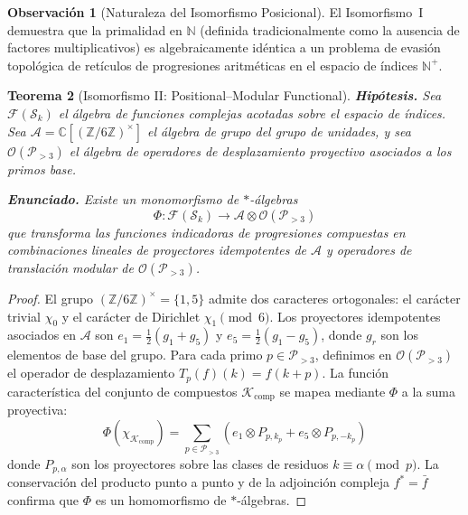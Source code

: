 \documentclass{article}
\numberwithin{equation}{section}
\theoremstyle{plain}
\newtheorem{theorem}{Teorema}[section]
\theoremstyle{definition}
\newtheorem{remark}[theorem]{Observación}
\begin{document}
\begin{remark}[Naturaleza del Isomorfismo Posicional]
El Isomorfismo~I demuestra que la primalidad en $\mathbb{N}$ (definida tradicionalmente como la ausencia de factores multiplicativos) es algebraicamente idéntica a un problema de evasión topológica de retículos de progresiones aritméticas en el espacio de índices $\mathbb{N}^+$.
\end{remark}

\begin{theorem}[Isomorfismo II: Positional--Modular Functional]
\label{thm:iso-II}
\textbf{Hipótesis.} Sea $\mathcal{F}(\mathcal{S}_k)$ el álgebra de funciones complejas acotadas sobre el espacio de índices. Sea $\mathcal{A} = \mathbb{C}[(\mathbb{Z}/6\mathbb{Z})^\times]$ el álgebra de grupo del grupo de unidades, y sea $\mathcal{O}(\mathcal{P}_{>3})$ el álgebra de operadores de desplazamiento proyectivo asociados a los primos base.

\textbf{Enunciado.} Existe un monomorfismo de $\ast$-álgebras
\begin{equation}
\Phi: \mathcal{F}(\mathcal{S}_k) \longrightarrow \mathcal{A} \otimes \mathcal{O}(\mathcal{P}_{>3})
\end{equation}
que transforma las funciones indicadoras de progresiones compuestas en combinaciones lineales de proyectores idempotentes de $\mathcal{A}$ y operadores de translación modular de $\mathcal{O}(\mathcal{P}_{>3})$.
\end{theorem}

\begin{proof}
El grupo $(\mathbb{Z}/6\mathbb{Z})^\times = \{1, 5\}$ admite dos caracteres ortogonales: el carácter trivial $\chi_0$ y el carácter de Dirichlet $\chi_1 \pmod 6$. Los proyectores idempotentes asociados en $\mathcal{A}$ son $e_1 = \frac{1}{2}(g_1 + g_5)$ y $e_5 = \frac{1}{2}(g_1 - g_5)$, donde $g_r$ son los elementos de base del grupo. Para cada primo $p \in \mathcal{P}_{>3}$, definimos en $\mathcal{O}(\mathcal{P}_{>3})$ el operador de desplazamiento $T_p(f)(k) = f(k + p)$. La función característica del conjunto de compuestos $\mathcal{K}_{\text{comp}}$ se mapea mediante $\Phi$ a la suma proyectiva:
\begin{equation}
\Phi(\chi_{\mathcal{K}_{\text{comp}}}) = \sum_{p \in \mathcal{P}_{>3}} \left( e_1 \otimes P_{p, k_p} + e_5 \otimes P_{p, -k_p} \right)
\end{equation}
donde $P_{p, \alpha}$ son los proyectores sobre las clases de residuos $k \equiv \alpha \pmod p$. La conservación del producto punto a punto y de la adjoinción compleja $f^* = \bar{f}$ confirma que $\Phi$ es un homomorfismo de $\ast$-álgebras.
\end{proof}
\end{document}
